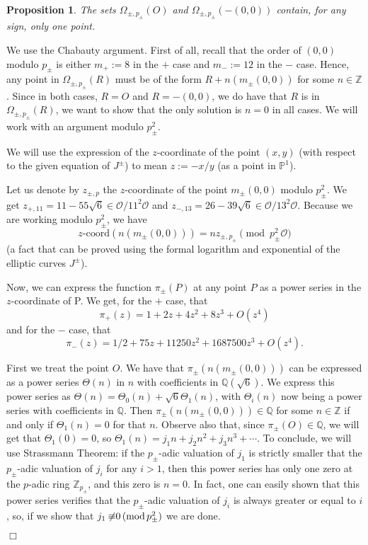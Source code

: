 \documentclass[a4paper,12pt]{amsart}
\newtheorem{prop}[thm]{Proposition}
\theoremstyle{remark}
\theoremstyle{definition}
\newenvironment{pf}{\par\noindent{\bf Proof.}\enspace\ignorespaces}{{\hfill $\Box$}\par\par}
\begin{document}
\begin{prop}\label{goodpoints} The sets $\Omega_{\pm,p_{\pm}}(O)$ and
$\Omega_{\pm,p_{\pm}}(-(0,0))$ contain, for any sign, only one point.
\end{prop}

\begin{pf} We use the Chabauty argument. First of all,
recall that the order of $(0,0)$ modulo $p_{\pm}$ is either
$m_+:=8$ in the $+$ case and $m_-:=12$ in the $-$ case. Hence, any
point in $\Omega_{\pm,p_{\pm}}(R)$ must be of the form
$R+n(m_{\pm}(0,0))$ for some $n\in {{\mathbb{Z}}}$. Since in both cases,
$R=O$ and $R=-(0,0)$, we do have that $R$ is in
$\Omega_{\pm,p_{\pm}}(R)$, we want to show that the only solution
is $n=0$ in all cases. We will work with an argument modulo
$p_{\pm}^2$.

We will use the expression of the $z$-coordinate of the point $(x,y)$
(with respect to the given equation of $J^{\pm}$) to mean
$z:=-x/y$ (as a point in ${{\mathbb{P}}}^1$).

Let us denote by $z_{\pm,p}$ the $z$-coordinate of the point
$m_{\pm}(0,0)$ modulo $p_{\pm}^2$. We get
$z_{+,11}=11-55\sqrt{6}\in {{\mathcal{O}}}/11^2{{\mathcal{O}}}$ and $z_{-,13}=26-39\sqrt{6} \in {{\mathcal{O}}}/13^2{{\mathcal{O}}}$. Because we are working
modulo $p_{\pm}^2$, we have 
$$
z\mbox{-coord}(n(m_{\pm}(0,0)))=nz_{\pm,p_{\pm}} \pmod{p_{\pm}^2{{\mathcal{O}}}}
$$
(a fact that can be proved using the formal logarithm and
exponential of the elliptic curves $J^{\pm}$).

Now, we can express the function $\pi_{\pm}(P)$ at any point $P$
as a power series in the $z$-coordinate of P. We get, for the $+$
case, that
$$\pi_{+}(z)= 1 + 2z + 4z^2 + 8z^3 + O(z^4) $$
and for the $-$ case, that
$$\pi_{-}(z)=1/2 + 75z + 11250z^2 + 1687500z^3 + O(z^4).$$

First we treat the point $O$. We have that
$\pi_{\pm}(n(m_{\pm}(0,0)))$ can be expressed as a power series
$\Theta(n)$ in $n$ with coefficients in ${{\mathbb{Q}}}(\sqrt{6})$. We
express this power series as
$\Theta(n)=\Theta_0(n)+\sqrt{6}\Theta_1(n)$, with $\Theta_i(n)$
now being a power series with coefficients in ${{\mathbb{Q}}}$. Then
$\pi_{\pm}(n(m_{\pm}(0,0)))\in {{\mathbb{Q}}}$ for some $n\in {{\mathbb{Z}}}$ if and only
if $\Theta_1(n)=0$ for that $n$. Observe also that, since
$\pi_{\pm}(O)\in {{\mathbb{Q}}}$, we will get that $\Theta_1(0)=0$, so
$\Theta_1(n)=j_1n+j_2n^2+j_3n^3+\cdots$. To conclude, we will use
Strassmann Theorem: if the $p_{\pm}$-adic valuation of $j_1$ is
strictly smaller that the $p_{\pm}$-adic valuation of $j_i$ for
any $i>1$, then this power series has only one zero at the
$p$-adic ring ${{\mathbb{Z}}}_{p_{\pm}}$, and this zero is $n=0$. In fact,
one can easily shown that this power series verifies that the
$p_{\pm}$-adic valuation of $j_i$ is always greater or equal to
$i$, so, if we show that $j_1\not{\!\!\equiv} 0 {\,({\rm mod\,}{{p_{\pm}^2}}) }$
we are done.


\end{pf}
\end{document}
